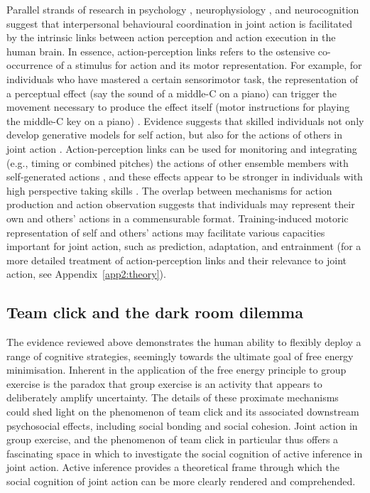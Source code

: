 \begin{CJK}{UTF8}{gbsn}
Parallel strands of research in psychology \citep{Prinz1990,Prinz1997,Prinz2013}, neurophysiology \citep{Rizzolatti2004,Rizzolatti2010}, and neurocognition \citep{Wolpert1998,Wolpert2000} suggest that interpersonal behavioural coordination in joint action is facilitated by the intrinsic links between action perception and action execution in the human brain.  In essence, action-perception links refers to the ostensive co-occurrence of a stimulus for action and its motor representation.  For example, for individuals who have mastered a certain sensorimotor task, the representation of a perceptual effect (say the sound of a middle-C on a piano) can trigger the movement necessary to produce the effect itself (motor instructions for playing the middle-C key on a piano) \citep{Novembre2014}. Evidence suggests that skilled individuals not only develop generative models for self action, but also for the actions of others in joint action \citep{Novembre2012}. Action-perception links can be used for monitoring and integrating (e.g., timing or combined pitches) the actions of other ensemble members with self-generated actions \citep{Loehr2013}, and these effects appear to be stronger in individuals with high perspective taking skills \citep{Novembre2012,Loehr2013}.  The overlap between mechanisms for action production and action observation suggests that individuals may represent their own and others’ actions in a commensurable format.  Training-induced motoric representation of self and others' actions may facilitate various capacities important for joint action, such as prediction, adaptation, and entrainment (for a more detailed treatment of action-perception links and their relevance to joint action, see Appendix~\ref{app2:theory}).



    \subsection{Team click and the dark room dilemma}
    The evidence reviewed above demonstrates the human ability to flexibly deploy a range of cognitive strategies, seemingly towards the ultimate goal of free energy minimisation.  Inherent in the application of the free energy principle to group exercise is the paradox that group exercise is an activity that appears to deliberately amplify uncertainty.
    The details of these proximate mechanisms could shed light on the phenomenon of team click and its associated downstream psychosocial effects, including social bonding and social cohesion.  Joint action in group exercise, and the phenomenon of team click in particular thus offers a fascinating space in which to investigate the social cognition of active inference in joint action.  Active inference provides a theoretical frame through which the social cognition of joint action can be more clearly rendered and comprehended.


\end{CJK}
